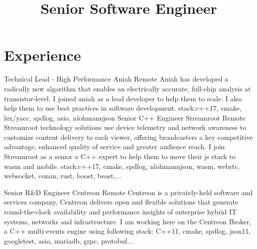 \documentclass[11pt,a4paper,sans]{moderncv}
\title{Senior Software Engineer}
\begin{document}
\makecvtitle

\section{Experience}

{Technical Lead - High Performance}
{Aniah}
{Remote}
{}
{Aniah has developed a radically new algorithm that enables an electrically accurate, full-chip analysis at transistor-level.
I joined aniah as a lead developer to help them to scale. I also help them to use best practices in software development.\newline{}
stack:c++17, cmake, lex/yacc, spdlog, asio, nlohmannjson}
{Senior C++ Engineer}
{Streamroot}
{Remote}
{}
{Streamroot technology solutions use device telemetry and network awareness to customize content delivery to each viewer, offering broadcasters a key competitive advantage, enhanced quality of service and greater audience reach.
I join Streamroot as a senior a C++ expert to help them to move their js stack to wasm and mobile.\newline{}
stack:c++17, cmake, spdlog, nlohmannjson, wasm, webrtc, websocket, conan, rust, boost, beast,...}

{Senior R\&D Engineer}
{Centreon}
{Remote}
{}
{Centreon is a privately-held software and services company, Centreon
delivers open and flexible solutions that generate round-the-clock availability and performance insights of enterprise hybrid IT systems, networks and infrastructure.
I am working here on the Centreon Broker, a C++ multi-events engine using following\newline{}
stack: C++11, cmake, spdlog, json11, googletest, asio, mariadb, grpc, protobuf...}
\end{document}

